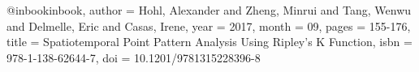 @inbook{inbook,
author = {Hohl, Alexander and Zheng, Minrui and Tang, Wenwu and Delmelle, Eric and Casas, Irene},
year = {2017},
month = {09},
pages = {155-176},
title = {Spatiotemporal Point Pattern Analysis Using Ripley's K Function},
isbn = {978-1-138-62644-7},
doi = {10.1201/9781315228396-8}
}